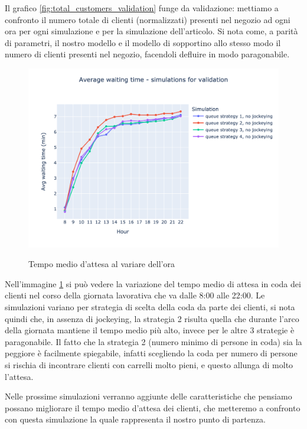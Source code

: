 Il grafico \ref{fig:total_customers_validation} funge da validazione: mettiamo a confronto il numero totale di clienti (normalizzati) presenti nel negozio ad ogni ora per ogni simulazione e per la simulazione dell'articolo. Si nota come, a parità di parametri, il nostro modello e il modello di \cite{article1} sopportino allo stesso modo il numero di clienti presenti nel negozio, facendoli defluire in modo paragonabile.

\begin{figure}[H]
	\centering
	\includegraphics[width=12cm]{"images/results/avg_wt_validation.png"}
	\label{fig:avg_wt_validation}
	\caption{Tempo medio d'attesa al variare dell'ora}
\end{figure}


Nell'immagine \ref{fig:avg_wt_validation} si può vedere la variazione del tempo medio di attesa in coda dei clienti nel corso della giornata lavorativa che va dalle 8:00 alle 22:00. Le simulazioni variano per strategia di scelta della coda da parte dei clienti, si nota quindi che, in assenza di jockeying, la strategia 2 risulta quella che durante l'arco della giornata mantiene il tempo medio più alto, invece per le altre 3 strategie è paragonabile. Il fatto che la strategia 2 (numero minimo di persone in coda) sia la peggiore è facilmente spiegabile, infatti scegliendo la coda per numero di persone si rischia di incontrare clienti con carrelli molto pieni, e questo allunga di molto l'attesa.

Nelle prossime simulazioni verranno aggiunte delle caratteristiche che pensiamo possano migliorare il tempo medio d'attesa dei clienti, che metteremo a confronto con questa simulazione la quale rappresenta il nostro punto di partenza.

